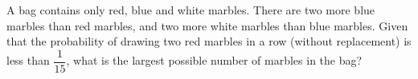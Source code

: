 A bag contains only red, blue and white marbles. There are two more blue marbles than red marbles, and two more white marbles than blue marbles. Given that the probability of drawing two red marbles in a row (without replacement) is less than $\dfrac{1}{15}$, what is the largest possible number of marbles in the bag?
